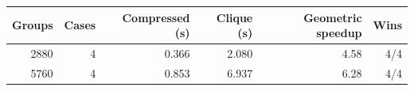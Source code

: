 \begin{tabular}{rrrrrr}
\toprule
Groups & Cases & Compressed (s) & Clique (s) & Geometric speedup & Wins \\
\midrule
2880 & 4 & 0.366 & 2.080 & 4.58 & 4/4 \\
5760 & 4 & 0.853 & 6.937 & 6.28 & 4/4 \\
\bottomrule
\end{tabular}

